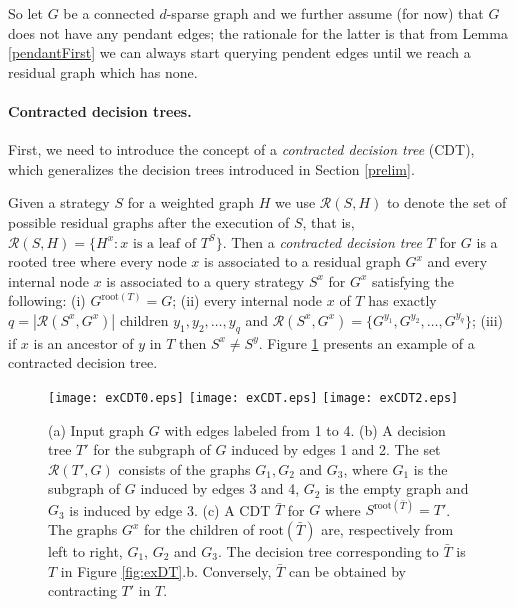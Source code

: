 \documentclass[12pt]{article}
\newcommand{\ro}[1]{\textrm{root}(#1)}
\begin{document}
	So let $G$ be a connected $d$-sparse graph and we further assume (for now) that $G$ does not have any pendant edges; the rationale for the latter is that from Lemma \ref{pendantFirst} we can always start querying pendent edges until we reach a residual graph which has none.
	
	\paragraph{Contracted decision trees.} First, we need to introduce the concept of a \emph{contracted decision tree} (CDT), which generalizes the decision trees introduced in Section \ref{prelim}.

	 Given a strategy $S$ for a weighted graph $H$ we use $\mathcal{R}(S, H)$ to denote the set of possible residual graphs after the execution of $S$, that is, $\mathcal{R}(S, H) = \{ H^x : x \textrm{ is a leaf of } T^S\}$. Then a \emph{contracted decision tree} $T$ for $G$ is a rooted tree where every node $x$ is associated to a residual graph $G^x$ and every internal node $x$ is associated to a query strategy $S^x$ for $G^x$ satisfying the following: (i) $G^{\ro{T}} = G$; (ii) every internal node $x$ of $T$ has exactly $q = |\mathcal{R}(S^x, G^x)|$ children $y_1, y_2, \ldots, y_q$ and $\mathcal{R}(S^x, G^x) = \{G^{y_1}, G^{y_2}, \ldots, G^{y_q}\}$; (iii) if $x$ is an ancestor of $y$ in $T$ then $S^x \neq S^y$. Figure \ref{fig:exCDT} presents an example of a contracted decision tree. 
	 
	\begin{figure}
	\centering
		\texttt{[image: exCDT0.eps]} \hspace{45pt}
		\texttt{[image: exCDT.eps]} \hspace{45pt}
		\texttt{[image: exCDT2.eps]}
	\caption{(a) Input graph $G$ with edges labeled from 1 to 4. (b) A decision tree $T'$ for the subgraph of $G$ induced by edges 1 and 2. The set $\mathcal{R}(T', G)$ consists of the graphs $G_1, G_2$ and $G_3$, where $G_1$ is the subgraph of $G$ induced by edges 3 and 4, $G_2$ is the empty graph and $G_3$ is induced by edge 3. (c) A CDT $\bar{T}$ for $G$ where $S^{\ro{\bar{T}}} = T'$. The graphs $G^x$ for the children of $\ro{\bar{T}}$ are, respectively from left to right, $G_1$, $G_2$ and $G_3$. The decision tree corresponding to $\bar{T}$ is $T$ in Figure \ref{fig:exDT}.b. Conversely, $\bar{T}$ can be obtained by contracting $T'$ in $T$.}
	\label{fig:exCDT}
\end{figure}
	 
\end{document}
